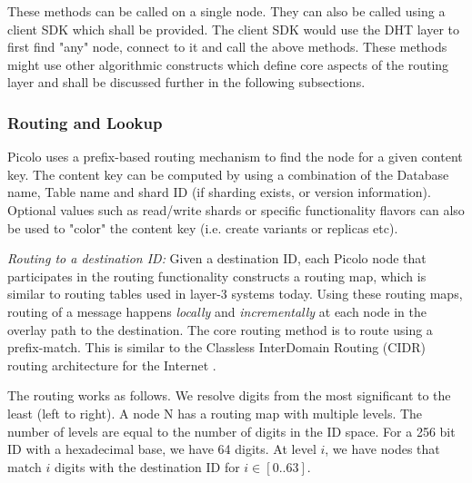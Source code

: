 These methods can be called on a single node. They can also be called using a client SDK which shall be provided. The
client SDK would use the DHT layer to first find "any" node, connect to it and call the above methods. These methods
might use other algorithmic constructs which define core aspects of the routing layer and shall be discussed further in
the following subsections.

\subsubsection{Routing and Lookup}
\label{net:routing}

Picolo uses a prefix-based routing mechanism to find the node for a given content key. The content key can be computed
by using a combination of the Database name, Table name and shard ID (if sharding exists, or version information).
Optional values such as read/write shards or specific functionality flavors can also be used to "color" the content key
(i.e. create variants or replicas etc).



{\em Routing to a destination ID:}
Given a destination ID, each Picolo node that participates in the routing functionality constructs a routing map, which
is similar to routing tables used in layer-3 systems today. Using these routing maps, routing of a message happens {\em
locally} and {\em incrementally} at each node in the overlay path to the destination. The core routing method is to
route using a prefix-match. This is similar to the Classless InterDomain Routing (CIDR) routing architecture for the Internet
\cite{cidr_rfc}.

The routing works as follows. We resolve digits from the most significant to the least (left to right). A node N has a
routing map with multiple levels. The number of levels are equal to the number of digits in the ID space. For a 256 bit
ID with a hexadecimal base, we have 64 digits. At level \(i\), we have nodes that match \(i\) digits with the
destination ID for \( i \in [ 0..63 ]\).

